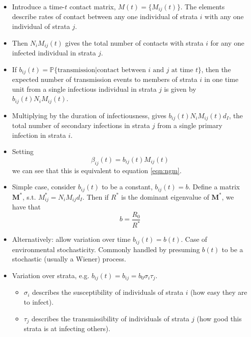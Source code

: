 \documentclass{article}
\renewcommand{\vec}[1]{\boldsymbol{{#1}}}
\begin{document}
\begin{itemize}
\item Introduce a time-$t$ contact matrix, $M(t) = \{M_{ij}(t)\}$. The elements describe rates of contact between any one individual of strata $i$ with any one individual of strata $j$.
\item Then $N_i M_{ij}(t)$ gives the total number of contacts with strata $i$ for any one infected individual in strata $j$.
\item If $b_{ij}(t) = \mathbb{P}\{\text{transmission}\lvert \text{contact between } i \text{ and } j \text{ at time } t\}$, then the expected number of transmission events to members of strata $i$ in one time unit from a single infectious individual in strata $j$ is given by $b_{ij}(t) N_i M_{ij}(t)$.
\item Multiplying by the duration of infectiousness, gives 
  $b_{ij}(t) N_i M_{ij}(t) d_I$, the total number of secondary infections in strata $j$ from a single primary infection in strata $i$.
\item Setting
  \begin{equation}\label{eqn:beta}
    \beta_{ij}(t) = b_{ij}(t)M_{ij}(t)
  \end{equation}
  we can see that this is equivalent to equation \eqref{eqn:ngm}.
\item Simple case, consider $b_{ij}(t)$ to be a constant, $b_{ij}(t) = b$. Define a matrix $\vec{M}^*$, s.t. $M^*_{ij} = N_i M_{ij} d_I$. Then if $R^*$ is the dominant eigenvalue of $\vec{M}^*$, we have that
  \begin{equation*}
    b = \frac{R_0}{R^*}
  \end{equation*}
\item Alternatively: allow variation over time $b_{ij}(t) = b(t)$. Case of environmental stochasticity. Commonly handled by presuming $b(t)$ to be a stochastic (usually a Wiener) process.
\item Variation over strata, e.g. $b_{ij}(t) = b_{ij} = b_0 \sigma_i \tau_j$.
  \begin{itemize}
  \item{$\sigma_i$} describes the susceptibility of individuals of strata $i$ (how easy they are to infect).
    \item{$\tau_j$} describes the transmissibility of individuals of strata $j$ (how good this strata is at infecting others).
  \end{itemize}
\end{itemize}
\end{document}
